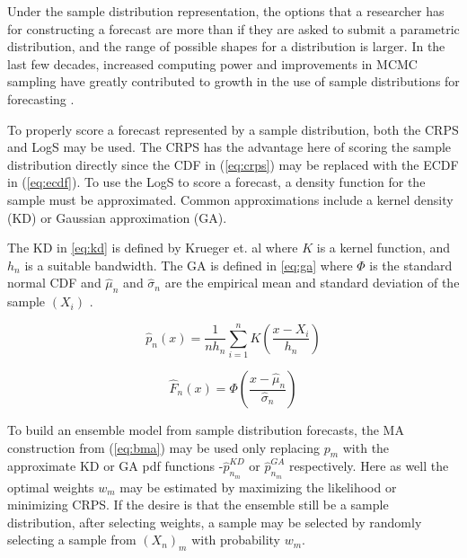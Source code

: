 \documentclass[11pt,notitlepage]{isuthesis}
\begin{document}
Under the sample distribution representation, the options that a researcher has 
for constructing a forecast are more than
if they are asked to submit a parametric distribution, and the range of possible 
shapes for a distribution is larger.
In the last few decades, increased computing power and improvements in MCMC
sampling have greatly contributed to growth in the use of
sample distributions for forecasting \cite[]{gneiting2007strictly}
\cite[see examples listed therein]{krueger2016probabilistic}.

To properly score a forecast represented by a sample distribution, both the CRPS
and LogS may be used. The CRPS has the advantage here of scoring the sample 
distribution directly since the CDF in  (\ref{eq:crps}) may be replaced with the 
ECDF in
(\ref{eq:ecdf}). To use the LogS to score a forecast, a density function for the 
sample must be approximated. Common approximations include a kernel density (KD)
or Gaussian approximation (GA).

The KD in \eqref{eq:kd} is defined by Krueger et. al 
where $K$ is a kernel function, and $h_n$ is a suitable bandwidth. The GA is 
defined in \eqref{eq:ga} where $\Phi$ is the standard normal CDF and 
$\hat{\mu}_n$ and $\hat{\sigma}_n$
are the empirical mean and standard deviation of the sample $(X_i)$
\cite[see also for a comparison of scoring MCMC drawn forecasts between the CRPS 
and the LogS]{krueger2016probabilistic}.

\begin{equation}
\label{eq:kd}
  \hat{p}_n(x) = \frac{1}{n h_n} \sum_{i=1}^n K \left( \frac{x-X_i}{h_n} \right) 
\end{equation}

\begin{equation}
\label{eq:ga}
  \hat{F}_n(x) = \Phi  \left( \frac{x-\hat{\mu}_n}{\hat{\sigma}_n} \right)
\end{equation}




To build an ensemble model from sample distribution forecasts, the MA 
construction from (\ref{eq:bma}) may be used only replacing $p_m$ with the
approximate KD or GA pdf functions
-$\hat{p}_{n_m}^{KD}$ or $\hat{p}_{n_m}^{GA}$ respectively.  
Here as well the optimal weights 
$w_m$ may be estimated by maximizing the likelihood or minimizing CRPS. 
If the desire is that the ensemble still be
a sample distribution, after selecting weights, a sample may be selected by 
randomly selecting a sample from $(X_n)_m$ with probability $w_m$.
\end{document}
